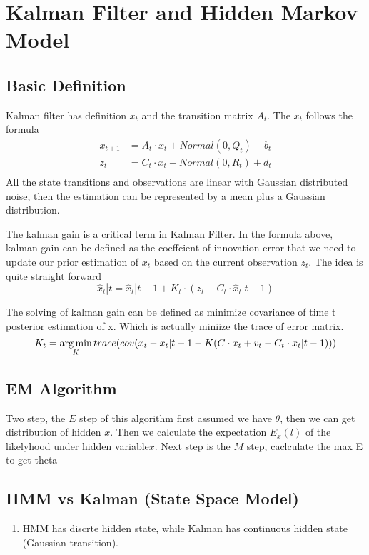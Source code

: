 \section{Kalman Filter and Hidden Markov Model}

\subsection{Basic Definition}
Kalman filter has definition $x_t$ and the transition matrix $A_t$. The $x_t$ follows the formula
\begin{equation}
  \begin{aligned}
    x_{t+1} &= A_t \cdot x_t + Normal(0, Q_t) + b_t\\
    z_{t} &= C_t \cdot x_t + Normal(0, R_t) + d_t\\
  \end{aligned}
\end{equation}
All the state transitions and observations are linear with Gaussian distributed noise, then the
estimation can be represented by a mean plus a Gaussian distribution.

The kalman gain is a critical term in Kalman Filter. In the formula above, kalman gain can be defined as the {\color{blue}coeffcient of
innovation error that we need to update our prior estimation of $x_t$ }based on the current observation $z_t$. The idea is quite
straight forward  $$\hat{x}_t|t = \hat{x}_t|t-1 + K_t \cdot (z_t - C_t \cdot \hat{x}_t|t-1)$$

The solving of kalman gain can be defined as minimize covariance of time t posterior estimation of x. Which is actually miniize the trace of error matrix.
\begin{equation}
K_t = \operatorname*{arg\,min}_K trace( cov(x_t - x_t|t-1 - K(C \cdot x_t + v_t - C_t \cdot x_t|t-1)))
\end{equation}

\subsection{EM Algorithm}
Two step, the $E$ step of this algorithm first assumed we have $\theta$, then we can get distribution of hidden $x$. Then we calculate the expectation $E_{x}(l)$ of the likelyhood under hidden variable$x$.
Next step is the $M$ step, caclculate the max E to get theta

\subsection{HMM vs Kalman (State Space Model)}
\begin{enumerate}
\item HMM has discrte hidden state, while Kalman has continuous hidden state (Gaussian transition).
\end{enumerate}
